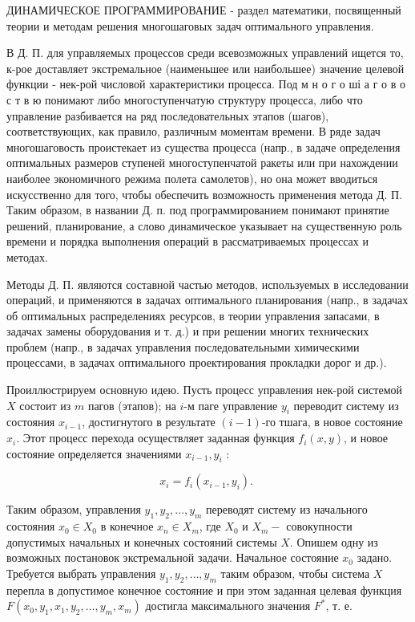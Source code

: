 \documentclass[10pt]{article}
\begin{document}
ДИНАМИЧЕСКОЕ ПРОГРАММИРОВАНИЕ - раздел математики, посвященный теории и методам решения многошаговых задач оптимального управления.



В Д. П. для управляемых процессов среди всевозможных управлений ищется то, к-рое доставляет экстремальное (наименьшее или наибольшее) значение целевой функции - нек-рой числовой характеристики процесса. Под м н о г о ші а г о в о с т в ю понимают либо многоступенчатую структуру процесса, либо что управление разбивается на ряд последовательных этапов (шагов), соответствующих, как правило, различным моментам времени. В ряде задач многошаговость проистекает из существа процесса (напр., в задаче определения оптимальных размеров ступеней многоступенчатой ракеты или при нахождении наиболее экономичного режима полета самолетов), но она может вводиться искусственно для того, чтобы обеспечить возможность применения метода Д. П. Таким образом, в названии Д. п. под программированием понимают принятие решений, планирование, а слово динамическое указывает на существенную роль времени и порядка выполнения операций в рассматриваемых процессах и методах.



Методы Д. П. являются составной частью методов, используемых в исследовании операций, и применяются в задачах оптимального планирования (напр., в задачах об оптимальных распределениях ресурсов, в теории управления запасами, в задачах замены оборудования и т. д.) и при решении многих технических проблем (напр., в задачах управления последовательными химическими процессами, в задачах оптимального проектирования прокладки дорог и др.).



Проиллюстрируем основную идею. Пусть процесс управления нек-рой системой $X$ состоит из $m$ пагов (этапов); на $i$-м паге управление $y_{i}$ переводит систему из состояния $x_{i-1}$, достигнутого в результате $(i-1)$-го тшага, в новое состояние $x_{i}$. Этот процесс перехода осуществляет заданная функция $f_{i}(x, y)$, и новое состояние определяется значениями $x_{i-1}, y_{i}$ :



\[

x_{i}=f_{i}\left(x_{i-1}, y_{i}\right) \text {. }

\]



Таким образом, управления $y_{1}, y_{2}, \ldots, y_{m}$ переводят систему из начального состояния $x_{0} \in X_{0}$ в конечное $x_{n} \in X_{m}$, где $X_{0}$ и $X_{m}-$ совокупности допустимых начальных и конечных состояний системы $X$. Опишем одну из возможных постановок экстремальной задачи. Начальное состояние $x_{0}$ задано. Требуется выбрать управления $y_{1}, y_{2}, \ldots, y_{m}$ таким образом, чтобы система $X$ перепла в допустимое конечное состояние и при этом заданная целевая функция $F\left(x_{0}, y_{1}, x_{1}, y_{2}, \ldots, y_{m}, x_{m}\right)$ достигла максимального значения $F^{*}$, т. е.
\end{document}
